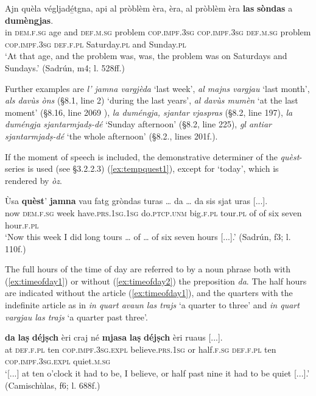 \ea
\label{ex:tempdefart3}
\gll  Ajn quèla végljadé̱tgna, api al pròblèm èra, èra, al pròblèm èra \textbf{las} \textbf{sòndas} a \textbf{dumèngjas}.   \\
in  \textsc{dem.f.sg} age and \textsc{def.m.sg} problem \textsc{cop.impf.3sg} \textsc{cop.impf.3sg} \textsc{def.m.sg} problem \textsc{cop.impf.3sg} \textsc{def.f.pl} Saturday.\textsc{pl} and Sunday.\textsc{pl} \\
\glt `At that age, and the problem was, was, the problem was on Saturdays and Sundays.' (Sadrún, m4; l. 528ff.)
\z



Further examples are \textit{l' jamna vargjèda} `last week', \textit{al majns vargjau} `last month', \textit{als davùs òns} (§8.1, line 2) `during the last years', \textit{al davùs mumèn} `at the last moment' (§8.16, line 2069 ), \textit{la duméngja, sjantar vjaspras} (§8.2, line 197), \textit{la duméngja sjantarmjadṣ-dé} `Sunday afternoon' (§8.2, line 225), \textit{gl antiar sjantarmjadṣ-dé} `the whole afternoon' (§8.2., lines 201f.).

If the moment of speech is included, the demonstrative determiner of the \textit{quèst}-series is used (see §3.2.2.3) (\ref{ex:tempquest1}), except for `today', which is rendered by \textit{òz}.

\ea
\label{ex:tempquest1}
\gll Ùsa \textbf{quèst}’ \textbf{jamna} vau fatg gròndas turas … da … da sis sjat uras [...].  \\
now \textsc{dem.f.sg} week have.\textsc{prs.1sg.1sg} do.\textsc{ptcp.unm} big.\textsc{f.pl} tour.\textsc{pl} {} of {} of six seven hour.\textsc{f.pl}\\
\glt `Now this week I did long tours … of … of six seven hours [...].' (Sadrún, f3; l. 110f.)
\z

The full hours of the time of day are referred to by a noun phrase both with (\ref{ex:timeofday1}) or without (\ref{ex:timeofday2}) the preposition \textit{da}. The half hours are indicated without the article (\ref{ex:timeofday1}), and the quarters with the indefinite article as in \textit{in quart avaun las trajs} `a quarter to three' and \textit{in quart vargjau las trajs} `a quarter past three'.

\ea
\label{ex:timeofday1}
\gll    [...] \textbf{da} \textbf{laṣ} \textbf{déjṣch} èri craj né \textbf{mjasa} \textbf{laṣ} \textbf{déjṣch} èri ruaus [...].\\
{} at \textsc{def.f.pl} ten \textsc{cop.impf.3sg.expl} believe.\textsc{prs.1sg} or half.\textsc{f.sg} \textsc{def.f.pl} ten \textsc{cop.impf.3sg.expl} quiet.\textsc{m.sg}\\
\glt `[...] at ten o’clock it had to be, I believe, or half past nine it had to be quiet [...].' (Camischùlas, f6; l. 688f.)
\z

